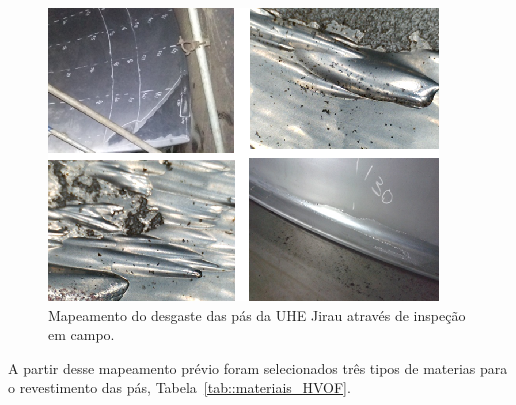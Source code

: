 \begin{figure}
	\centering
	\includegraphics[width=1\columnwidth]{sota/figs/projeto/proj_hvof_5.png}
    \caption{Mapeamento do desgaste das pás da UHE Jirau através de inspeção em campo.}
    \label{fig:proj_hvof_5}
\end{figure}

A partir desse mapeamento prévio foram selecionados três tipos de materias para
o revestimento das pás, Tabela~\ref{tab::materiais_HVOF}.

